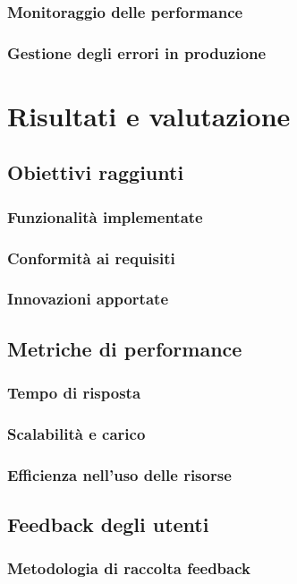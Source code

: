 \documentclass[12pt,a4paper,oneside]{report}
\begin{document}
\subsection{Monitoraggio delle performance}
\subsection{Gestione degli errori in produzione}





\chapter{Risultati e valutazione}
\section{Obiettivi raggiunti}
\subsection{Funzionalità implementate}
\subsection{Conformità ai requisiti}
\subsection{Innovazioni apportate}

\section{Metriche di performance}
\subsection{Tempo di risposta}
\subsection{Scalabilità e carico}
\subsection{Efficienza nell'uso delle risorse}

\section{Feedback degli utenti}
\subsection{Metodologia di raccolta feedback}
\end{document}
